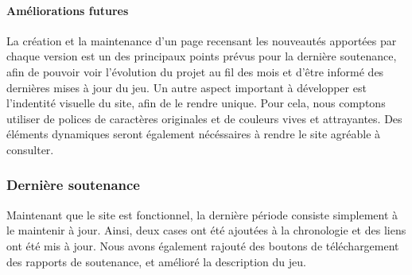         
        \paragraph{Améliorations futures}

            La création et la maintenance d'un page recensant les nouveautés apportées par chaque version est un des 
            principaux points prévus pour la dernière soutenance, afin de pouvoir voir l'évolution du projet au fil des 
            mois et d'être informé des dernières mises à jour du jeu. Un autre aspect important à développer est l'indentité
            visuelle du site, afin de le rendre unique. Pour cela,  nous comptons utiliser de polices de caractères originales 
            et de couleurs vives et attrayantes. Des éléments dynamiques seront également nécéssaires à rendre le site agréable 
            à consulter.

    \subsubsection{Dernière soutenance}

        Maintenant que le site est fonctionnel, la dernière période consiste simplement à le maintenir à jour. Ainsi, deux cases 
        ont été ajoutées à la chronologie et des liens ont été mis à jour. Nous avons également rajouté des boutons de téléchargement 
        des rapports de soutenance, et amélioré la description du jeu.